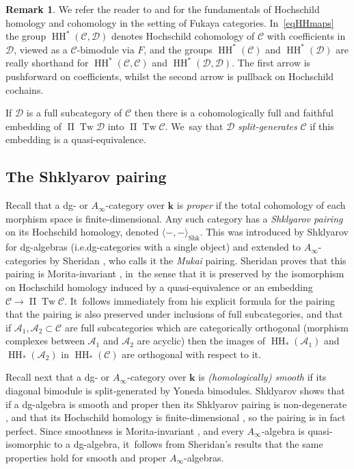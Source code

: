 \documentclass[10pt]{amsart}
\newcommand{\ie}{i.e.}
\theoremstyle{definition}
\newtheorem{remark}[theorem]{Remark}
\newcommand{\calA}{\mathcal{A}}
\newcommand{\calC}{\mathcal{C}}
\newcommand{\calD}{\mathcal{D}}
\newcommand{\kk}{{\boldsymbol{k}}}
\newcommand{\HH}{\operatorname{HH}}
\newcommand{\Tw}{\operatorname{Tw}}
\newcommand{\oPi}{\operatorname{\Pi}}
\newcommand{\PiTw}{\oPi \Tw}
\newcommand{\Shk}[2]{\langle #1, #2 \rangle_\mathrm{Shk}}
\begin{document}
\begin{remark}
We refer the reader to \cite[\S 2]{RitterSmith} and \cite[App.\,A]{SheridanFano} for the fundamentals of Hochschild homology and cohomology in the setting of Fukaya categories. In~\eqref{eqHHmaps} the group $\HH^*(\calC, \calD)$ denotes Hochschild cohomology of $\calC$ with coefficients in $\calD$, viewed as a $\calC$-bimodule via $F$, and the groups $\HH^*(\calC)$ and $\HH^*(\calD)$ are really shorthand for $\HH^*(\calC, \calC)$ and $\HH^*(\calD, \calD)$. The first arrow is pushforward on coefficients, whilst the second arrow is pullback on Hochschild cochains.
\end{remark}

If $\calD$ is a full subcategory of $\calC$ then there is a cohomologically full and faithful embedding of $\PiTw \calD$ into $\PiTw \calC$. We~say that $\calD$ \emph{split-generates} $\calC$ if this embedding is a quasi-equivalence.

\subsection{The Shklyarov pairing}
\label{sscShklyarov}

Recall that a dg- or $A_\infty$-category over $\kk$ is \emph{proper} if the total cohomology of each morphism space is finite-dimensional. Any such category has a \emph{Shklyarov pairing} on its Hochschild homology, denoted $\Shk{{-}}{{-}}$. This was introduced by Shklyarov \cite{ShklyarovHirzebruch} for dg-algebras (\ie dg-categories with a single object) and extended to $A_\infty$-categories by Sheridan \cite[\S 5]{SheridanHodge}, who calls it the \emph{Mukai} pairing. Sheridan proves that this pairing is Morita-invariant \cite[Prop.\,5.20]{SheridanHodge}, in~the sense that it is preserved by the isomorphism on Hochschild homology induced by a quasi-equivalence or an embedding $\calC \to \PiTw \calC$. It~follows immediately from his explicit formula for the pairing \cite[(35)]{SheridanHodge} that the pairing is also preserved under inclusions of full subcategories, and that if $\calA_1, \calA_2 \subset \calC$ are full subcategories which are categorically orthogonal (morphism complexes between $\calA_1$ and $\calA_2$ are acyclic) then the images of $\HH_*(\calA_1)$ and $\HH_*(\calA_2)$ in $\HH_*(\calC)$ are orthogonal with respect to it.

Recall next that a dg- or $A_\infty$-category over $\kk$ is \emph{(homologically) smooth} if its diagonal bimodule is split-generated by Yoneda bimodules. Shklyarov shows that if a dg-algebra is smooth and proper then its Shklyarov pairing is non-degenerate \cite[Th.\,5.3]{ShklyarovHirzebruch}, and that its Hochschild homology is finite-dimensional \cite[Th.\,4.6]{ShklyarovSerre}, so the pairing is in fact perfect. Since smoothness is Morita-invariant \cite[Prop.\,20]{GanatraAutomaticGeneration}, and every $A_\infty$-algebra is quasi-isomorphic to a dg-algebra, it~follows from Sheridan's results that the same properties hold for smooth and proper $A_\infty$-algebras.
\end{document}

